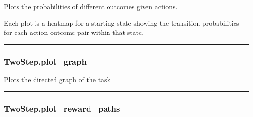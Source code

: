 \begin{Shaded}
\begin{Highlighting}[]
\OperatorTok{=}\OperatorTok{=}\OperatorTok{=}\OperatorTok{=}\NormalTok{)}
\end{Highlighting}
\end{Shaded}

Plots the probabilities of different outcomes given actions.

Each plot is a heatmap for a starting state showing the transition
probabilities for each action-outcome pair within that state.

\begin{center}\rule{0.5\linewidth}{\linethickness}\end{center}

\hypertarget{twostep.plot_graph}{%
\subsubsection{TwoStep.plot\_graph}\label{twostep.plot_graph}}

\begin{Shaded}
\begin{Highlighting}[]
\OperatorTok{=}\OperatorTok{=}\OperatorTok{=}\OperatorTok{=}\OperatorTok{=}\OperatorTok{=}\OperatorTok{=}\OperatorTok{=}\NormalTok{)}
\end{Highlighting}
\end{Shaded}

Plots the directed graph of the task

\begin{center}\rule{0.5\linewidth}{\linethickness}\end{center}

\hypertarget{twostep.plot_reward_paths}{%
\subsubsection{TwoStep.plot\_reward\_paths}\label{twostep.plot_reward_paths}}

